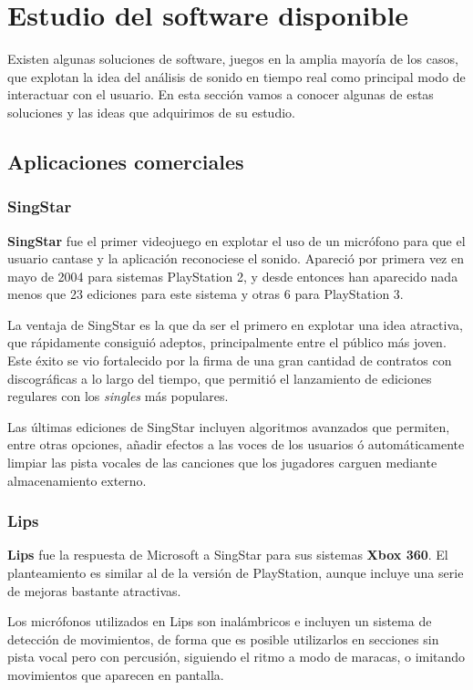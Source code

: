 \section{Estudio del software disponible}

Existen algunas soluciones de software, juegos en la amplia mayoría de los
casos, que explotan la idea del análisis de sonido en tiempo real como principal
modo de interactuar con el usuario. En esta sección vamos a conocer algunas de
estas soluciones y las ideas que adquirimos de su estudio.

\subsection{Aplicaciones comerciales}

\subsubsection{SingStar}
\textbf{SingStar} fue el primer videojuego en explotar el uso de un micrófono
para que el usuario cantase y la aplicación reconociese el sonido. Apareció por
primera vez en mayo de 2004 para sistemas PlayStation 2, y desde entonces han
aparecido nada menos que 23 ediciones para este sistema y otras 6 para
PlayStation 3.

La ventaja de SingStar es la que da ser el primero en explotar una idea
atractiva, que rápidamente consiguió adeptos, principalmente entre el público
más joven. Este éxito se vio fortalecido por la firma de una gran cantidad de
contratos con discográficas a lo largo del tiempo, que permitió el lanzamiento
de ediciones regulares con los \textit{singles} más populares.

Las últimas ediciones de SingStar incluyen algoritmos avanzados que permiten,
entre otras opciones, añadir efectos a las voces de los usuarios ó
automáticamente limpiar las pista vocales de las canciones que los jugadores
carguen mediante almacenamiento externo.

\subsubsection{Lips}
\textbf{Lips} fue la respuesta de Microsoft a SingStar para sus sistemas
\textbf{Xbox 360}. El planteamiento es similar al de la versión de PlayStation,
aunque incluye una serie de mejoras bastante atractivas.

Los micrófonos utilizados en Lips son inalámbricos e incluyen un sistema de
detección de movimientos, de forma que es posible utilizarlos en secciones sin
pista vocal pero con percusión, siguiendo el ritmo a modo de maracas, o imitando
movimientos que aparecen en pantalla.

